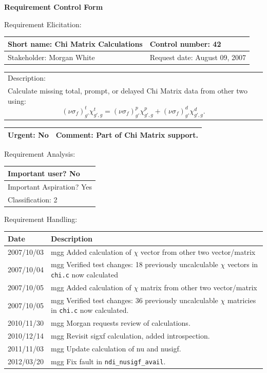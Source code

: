 \begin{center}\Large\bf
Requirement Control Form
\end{center}
\vspace{24pt}

Requirement Elicitation:

\begin{tabular}{|p{211pt}|p{211pt}|} \hline
Short name: Chi Matrix Calculations & Control number: 42\\ \hline
Stakeholder: Morgan White & Request date: August 09, 2007\\
\end{tabular}
\begin{tabular}{|p{433pt}|} \hline
Description: \\ 
Calculate missing total, prompt, or delayed Chi Matrix data from other
two using:
\begin{displaymath}
(\nu \sigma_f)_{g'}^t \chi_{g',g}^t = (\nu \sigma_f)_{g'}^p
  \chi_{g',g}^p + (\nu \sigma_f)_{g'}^d \chi_{g',g}^d.
\end{displaymath}\\
\hline
\end{tabular} 
\begin{tabular}{|p{211pt}|p{211pt}|} \hline
Urgent: No & Comment: Part of Chi Matrix support. \\ \hline
\end{tabular}

\vspace{24pt}

Requirement Analysis:

\begin{tabular}{|p{433pt}|} \hline
Important user? No \\ \hline
Important Aspiration? Yes \\ \hline
Classification: 2 \\ \hline
\end{tabular}
\vspace{24pt}

Requirement Handling:

\begin{tabular}{|p{72pt}|p{351pt}|} \hline
Date & Description \\ \hline
2007/10/03 & mgg Added calculation of $\chi$ vector from other two
vector/matrix\\ \hline
2007/10/04 & mgg Verified test changes: 18 previously uncalculable
$\chi$ vectors in \texttt{chi.c} now calculated\\ \hline 
2007/10/05 & mgg Added calculation of $\chi$ matrix from other two
vector/matrix\\ \hline
2007/10/05 & mgg Verified test changes: 36 previously uncalculable
$\chi$ matricies in \texttt{chi.c} now calculated.\\ \hline
2010/11/30 & mgg Morgan requests review of calculations. \\ \hline 
2010/12/14 & mgg Revisit sigxf calculation, added introspection. \\
\hline 
2011/11/03 & mgg Update calculation of nu and nusigf. \\ \hline
2012/03/20 & mgg Fix fault in \texttt{ndi\_nusigf\_avail}. \\ \hline
\end{tabular}
